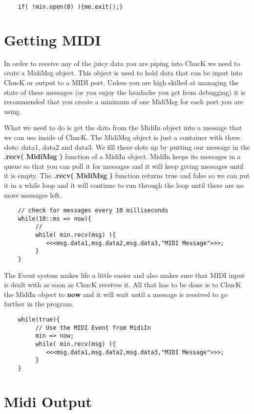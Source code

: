\begin{verbatim}
    if( !min.open(0) ){me.exit();}
\end{verbatim}

\section*{Getting MIDI}

In order to receive any of the juicy data you are piping into ChucK we need to ceate a MidiMsg object. This object is used to hold data that can be input into ChucK or output to a MIDI port. Unless you are high skilled at managing the state of these messages (or you enjoy the headache you get from debugging) it is recommended that you create a minimum of one MidiMsg for each port you are using. 

What we need to do is get the data from the MidiIn object into a message that we can use inside of ChucK. The MidiMsg object is just a container with three slots: data1, data2 and data3. We fill these slots up by putting our message in the  {\bf .recv( MidiMsg )} function of a MidiIn object. MidiIn keeps its messages in a queue so that you can poll it for messages and it will keep giving messages until it is empty. The {\bf .recv( MidiMsg )} function returns true and false so we can put it in a while loop and it will continue to run through the loop until there are no more messages left.


\begin{verbatim}
    // check for messages every 10 milliseconds
    while(10::ms => now){
         //
         while( min.recv(msg) ){
            <<<msg.data1,msg.data2,msg.data3,"MIDI Message">>>;
         }
    }
\end{verbatim}

The Event system makes life a little easier and also makes sure that MIDI input is dealt with as soon as ChucK receives it. All that has to be done is to ChucK the MidiIn object to {\bf now} and it will wait until a message is received to go further in the program.

\begin{verbatim}
    while(true){
         // Use the MIDI Event from MidiIn
         min => now;
         while( min.recv(msg) ){
            <<<msg.data1,msg.data2,msg.data3,"MIDI Message">>>;
         }
    }
\end{verbatim}

\section*{Midi Output}

